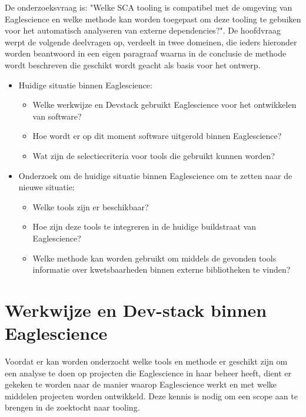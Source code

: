 De onderzoeksvraag is: "Welke SCA tooling is compatibel met de omgeving van Eaglescience en welke methode kan worden toegepast om deze tooling te gebuiken voor het automatisch analyseren van externe dependencies?". De hoofdvraag werpt de volgende deelvragen op, verdeelt in twee domeinen, die ieders hieronder worden beantwoord in een eigen paragraaf waarna in de conclusie de methode wordt beschreven die geschikt wordt geacht als basis voor het ontwerp.
\begin{itemize}
    \item Huidige situatie binnen Eaglescience:
    \begin{itemize}
        \item Welke werkwijze en Dev\-stack gebruikt Eaglescience voor het ontwikkelen van software?
        \item Hoe wordt er op dit moment software uitgerold binnen Eaglescience?
        \item Wat zijn de selectiecriteria voor tools die gebruikt kunnen worden?
    \end{itemize}

    \item Onderzoek om de huidige situatie binnen Eaglescience om te zetten naar de nieuwe situatie:
    \begin{itemize}
        \item Welke tools zijn er beschikbaar?
        \item Hoe zijn deze tools te integreren in de huidige buildstraat van Eaglescience?
        \item Welke methode kan worden gebruikt om middels de gevonden tools informatie over kwetsbaarheden binnen externe bibliotheken te vinden?
    \end{itemize}
\end{itemize}


\section{Werkwijze en Dev-stack binnen Eaglescience}\label{sec:werkwijze-en-dev-stack-binnen-eaglescience}
Voordat er kan worden onderzocht welke tools en methode er geschikt zijn om een analyse te doen op projecten die Eaglescience in haar beheer heeft, dient er gekeken te worden naar de manier waarop Eaglescience werkt en met welke middelen projecten worden ontwikkeld. Deze kennis is nodig om een scope aan te brengen in de zoektocht naar tooling.

